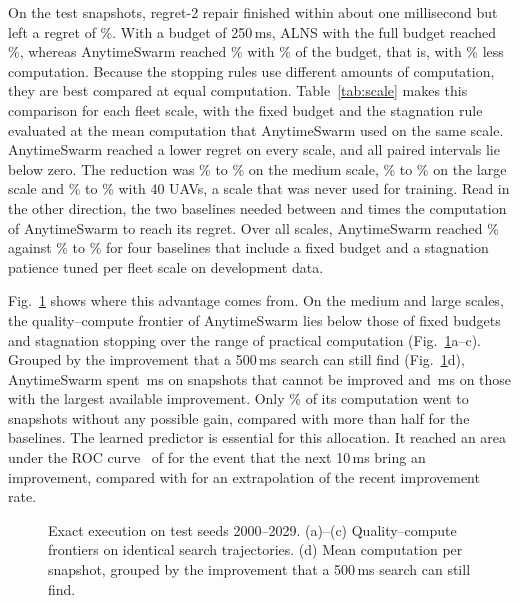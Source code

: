 \label{sec:static}
On the  test snapshots, regret-2 repair finished within about one millisecond but left a regret of
\%. With a budget of 250\,ms, ALNS with the full budget reached \%, whereas
AnytimeSwarm reached \% with \% of the budget, that is, with \% less computation.
Because the stopping rules use different amounts of computation, they are best compared at equal computation.
Table~\ref{tab:scale} makes this comparison for each fleet scale, with the fixed budget and the stagnation rule evaluated
at the mean computation that AnytimeSwarm used on the same scale. AnytimeSwarm reached a lower regret on every scale,
and all paired intervals lie below zero. The reduction was \% to \% on the
medium scale, \% to \% on the large scale and \% to
\% with 40 UAVs, a scale that was never used for training. Read in the other direction, the two
baselines needed between  and  times the computation of AnytimeSwarm to
reach its regret. Over all scales, AnytimeSwarm reached \% against \% to
\% for four baselines that include a fixed budget and a stagnation patience tuned per fleet scale
on development data.


Fig.~\ref{fig:static} shows where this advantage comes from. On the medium and large scales, the quality--compute
frontier of AnytimeSwarm lies below those of fixed budgets and stagnation stopping over the range of practical
computation (Fig.~\ref{fig:static}a--c). Grouped by the improvement that a 500\,ms search can still find
(Fig.~\ref{fig:static}d), AnytimeSwarm spent \,ms on snapshots that cannot be improved and
\,ms on those with the largest available improvement. Only \% of its computation went
to snapshots without any possible gain, compared with more than half for the baselines. The learned predictor is
essential for this allocation. It reached an area under the ROC curve~\cite{fawcett2006roc} of  for the
event that the next 10\,ms bring an improvement, compared with  for an extrapolation of the recent
improvement rate.

\begin{figure}[t]
\centering
{}\hspace{0.15in}
\caption{Exact execution on test seeds 2000--2029. (a)--(c) Quality--compute frontiers on identical search
trajectories. (d) Mean computation per snapshot, grouped by the improvement that a 500\,ms search can still
find.}\label{fig:static}
\end{figure}

